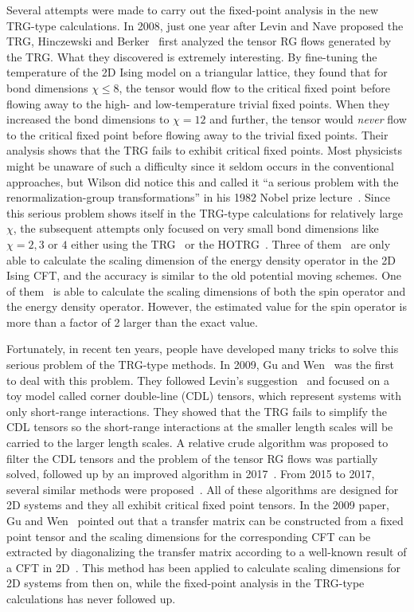 \documentclass[aps,prb,reprint,superscriptaddress]{revtex4-2}
\begin{document}
Several attempts were made to carry out the fixed-point analysis in the
new TRG-type calculations. In 2008, just one year after Levin and Nave
proposed the TRG, Hinczewski and Berker~\cite{Berker2008} first analyzed
the tensor RG flows generated by the TRG. What they discovered is
extremely interesting.  By fine-tuning the temperature of the 2D Ising
model on a triangular lattice, they found that for bond dimensions $\chi
\leq 8$, the tensor would flow to the critical fixed point before
flowing away to the high- and low-temperature trivial fixed points. When
they increased the bond dimensions to $\chi =  12$ and further, the
tensor would \textit{never} flow to the critical fixed point before
flowing away to the trivial fixed points. Their analysis shows that the
TRG fails to exhibit critical fixed points. Most physicists might be
unaware of such a difficulty since it seldom occurs in the conventional
approaches, but Wilson did notice this and called it ``a serious problem
with the renormalization-group transformations'' in his 1982 Nobel prize
lecture~\cite{wilsonNobel}.  Since this serious problem shows itself in
the TRG-type calculations for relatively large $\chi$, the subsequent
attempts only focused on very small bond dimensions like $\chi = 2, 3$
or $4$ either using the TRG~\cite{kadanoff2014,aoki2009} or the
HOTRG~\cite{meurice2013}. Three of
them~\cite{Berker2008,aoki2009,meurice2013} are only able to calculate
the scaling dimension of the energy density operator in the 2D Ising
CFT, and the accuracy is similar to the old potential moving schemes.
One of them~\cite{kadanoff2014} is able to calculate the scaling
dimensions of both the spin operator and the energy density operator.
However, the estimated value for the spin operator is more than a factor
of 2 larger than the exact value. 
%

Fortunately, in recent ten years, people have developed many tricks to
solve this serious problem of the TRG-type methods. In 2009, Gu and
Wen~\cite{GuWen2009} was the first to deal with this problem. They
followed Levin's suggestion~\cite{trg,LevinTalk} and focused on a toy
model called corner double-line (CDL) tensors, which represent systems
with only short-range interactions. They showed that the TRG fails to
simplify the CDL tensors so the short-range interactions at the smaller
length scales will be carried to the larger length scales. A relative
crude algorithm was proposed to filter the CDL tensors and the problem
of the tensor RG flows was partially solved, followed up by an improved
algorithm in 2017~\cite{looptnr}. From 2015 to 2017, several similar
methods were proposed~\cite{tnr,tnralgo,tnrplus}. All of these
algorithms are designed for 2D systems and they all exhibit critical
fixed point tensors. In the 2009 paper, Gu and Wen~\cite{GuWen2009}
pointed out that a transfer matrix can be constructed from a fixed point
tensor and the scaling dimensions for the corresponding CFT can be
extracted by diagonalizing the transfer matrix according to a well-known
result of a CFT in 2D~\cite{cardy1986}. This method has been applied to
calculate scaling dimensions for 2D systems from then on, while the
fixed-point analysis in the TRG-type calculations has never followed up.
%
\end{document}
